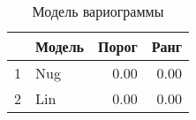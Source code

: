 \begin{table}[H]
\centering
\begin{tabular}{rlrr}
  \hline
 & Модель & Порог & Ранг \\ 
  \hline
1 & Nug & 0.00 & 0.00 \\ 
  2 & Lin & 0.00 & 0.00 \\ 
   \hline
\end{tabular}
\caption{Модель вариограммы} 
\label{table:manual_model}
\end{table}
